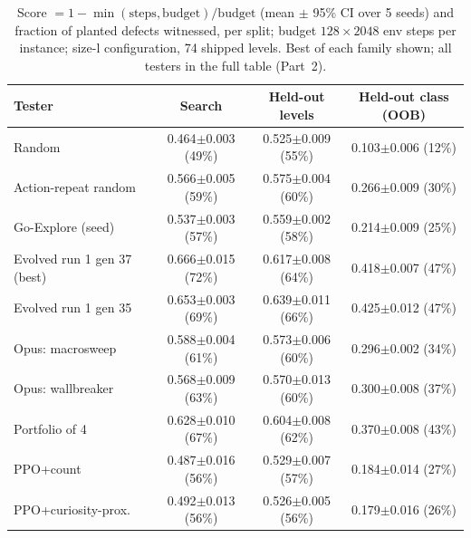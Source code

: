 \begin{table}[t]\centering\footnotesize
\begin{tabular}{lccc}
\toprule
Tester & Search & Held-out levels & Held-out class (OOB) \\
\midrule
Random & 0.464$\pm$0.003 (49\%) & 0.525$\pm$0.009 (55\%) & 0.103$\pm$0.006 (12\%) \\
Action-repeat random & 0.566$\pm$0.005 (59\%) & 0.575$\pm$0.004 (60\%) & 0.266$\pm$0.009 (30\%) \\
Go-Explore (seed) & 0.537$\pm$0.003 (57\%) & 0.559$\pm$0.002 (58\%) & 0.214$\pm$0.009 (25\%) \\
\midrule
Evolved run 1 gen 37 (best) & 0.666$\pm$0.015 (72\%) & 0.617$\pm$0.008 (64\%) & 0.418$\pm$0.007 (47\%) \\
Evolved run 1 gen 35 & 0.653$\pm$0.003 (69\%) & 0.639$\pm$0.011 (66\%) & 0.425$\pm$0.012 (47\%) \\
\midrule
Opus: macrosweep & 0.588$\pm$0.004 (61\%) & 0.573$\pm$0.006 (60\%) & 0.296$\pm$0.002 (34\%) \\
Opus: wallbreaker & 0.568$\pm$0.009 (63\%) & 0.570$\pm$0.013 (60\%) & 0.300$\pm$0.008 (37\%) \\
Portfolio of 4 & 0.628$\pm$0.010 (67\%) & 0.604$\pm$0.008 (62\%) & 0.370$\pm$0.008 (43\%) \\
\midrule
PPO+count & 0.487$\pm$0.016 (56\%) & 0.529$\pm$0.007 (57\%) & 0.184$\pm$0.014 (27\%) \\
PPO+curiosity-prox. & 0.492$\pm$0.013 (56\%) & 0.526$\pm$0.005 (56\%) & 0.179$\pm$0.016 (26\%) \\
\bottomrule
\end{tabular}
\caption{Score $=1-\min(\text{steps},\text{budget})/\text{budget}$ (mean $\pm$ 95\% CI over 5 seeds) and fraction of planted defects witnessed, per split; budget $128\times2048$ env steps per instance; size-l configuration, 74 shipped levels. Best of each family shown; all testers in the full table (Part~2).}
\label{tab:transfer}
\end{table}